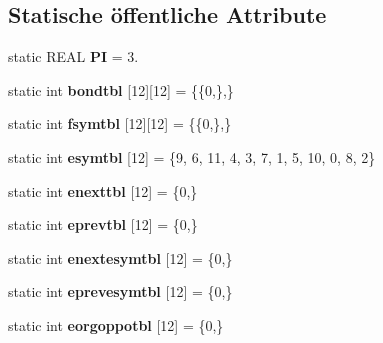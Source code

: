 \subsection*{Statische öffentliche Attribute}
\begin{DoxyCompactItemize}
\item 
\hypertarget{classtetgenmesh_ad6766e0d2dbbf0a642793fbd6ef98ae2}{static R\-E\-A\-L {\bfseries P\-I} = 3.}\label{classtetgenmesh_ad6766e0d2dbbf0a642793fbd6ef98ae2}

\item 
\hypertarget{classtetgenmesh_a46550a87561b0b4a7dfc7a312b03d3ea}{static int {\bfseries bondtbl} \mbox{[}12\mbox{]}\mbox{[}12\mbox{]} = \{\{0,\},\}}\label{classtetgenmesh_a46550a87561b0b4a7dfc7a312b03d3ea}

\item 
\hypertarget{classtetgenmesh_ae98d2426c6fc6665cb96dcfa9a5df790}{static int {\bfseries fsymtbl} \mbox{[}12\mbox{]}\mbox{[}12\mbox{]} = \{\{0,\},\}}\label{classtetgenmesh_ae98d2426c6fc6665cb96dcfa9a5df790}

\item 
\hypertarget{classtetgenmesh_ae23c95f112c7dcc119b8780b36d6c833}{static int {\bfseries esymtbl} \mbox{[}12\mbox{]} = \{9, 6, 11, 4, 3, 7, 1, 5, 10, 0, 8, 2\}}\label{classtetgenmesh_ae23c95f112c7dcc119b8780b36d6c833}

\item 
\hypertarget{classtetgenmesh_afc8cb9e38dc9efd6c4903b00679d693e}{static int {\bfseries enexttbl} \mbox{[}12\mbox{]} = \{0,\}}\label{classtetgenmesh_afc8cb9e38dc9efd6c4903b00679d693e}

\item 
\hypertarget{classtetgenmesh_aaa63200d533d2d774680a0cb72475361}{static int {\bfseries eprevtbl} \mbox{[}12\mbox{]} = \{0,\}}\label{classtetgenmesh_aaa63200d533d2d774680a0cb72475361}

\item 
\hypertarget{classtetgenmesh_a786d6315851349b63d53f1eb8a1fcef1}{static int {\bfseries enextesymtbl} \mbox{[}12\mbox{]} = \{0,\}}\label{classtetgenmesh_a786d6315851349b63d53f1eb8a1fcef1}

\item 
\hypertarget{classtetgenmesh_aed59b6aa2586787f5bd0820d1ce41b4f}{static int {\bfseries eprevesymtbl} \mbox{[}12\mbox{]} = \{0,\}}\label{classtetgenmesh_aed59b6aa2586787f5bd0820d1ce41b4f}

\item 
\hypertarget{classtetgenmesh_a7c43767f721d455559988e2f168ff4b2}{static int {\bfseries eorgoppotbl} \mbox{[}12\mbox{]} = \{0,\}}\label{classtetgenmesh_a7c43767f721d455559988e2f168ff4b2}


\end{DoxyCompactItemize}
